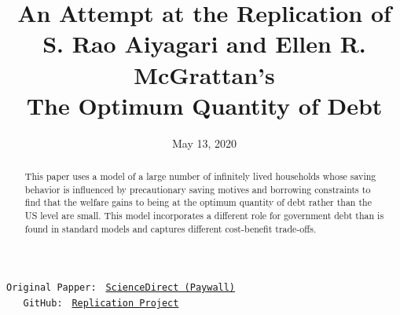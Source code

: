 \documentclass[titlepage,letterpaper]{\econtex}
\begin{document}


\title{An Attempt at the Replication of \\ S. Rao Aiyagari and Ellen R. McGrattan's  \\ The Optimum Quantity of Debt}

\newlength\TableWidth


\date{May 13, 2020}
\maketitle




\hypertarget{Abstract}{}
\begin{abstract}
This paper uses a model of a large number of infinitely lived households whose saving behavior is influenced by precautionary saving motives and borrowing constraints to find that the welfare gains to being at the optimum quantity of debt rather than the US level are small. This model incorporates a different role for government debt than is found in standard models and captures different cost-benefit trade-offs.
\end{abstract}

\vspace{-1cm}
\begin{authorsinfo}
\end{authorsinfo}

\hypertarget{links}{}
\medskip
\begin{small}
  \parbox{\textwidth}{
    \begin{center}
      \begin{tabbing}
        \texttt{Original Papper:~} \= \= \texttt{\href{https://www.sciencedirect.com/science/article/abs/pii/S0304393298000312}{ScienceDirect (Paywall)}} \\
        \texttt{~~~GitHub:~} \> \> \texttt{\href{https://github.com/raytobing/final_project/tree/master/replication}{Replication Project}} \\
      \end{tabbing}
    \end{center}

  } 
\end{small}
\end{document}
